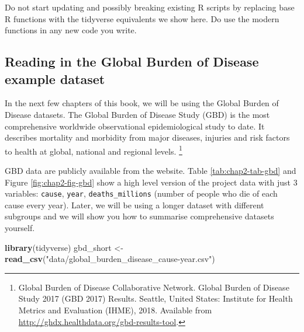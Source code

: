 \documentclass[
  12pt,
  krantz2]{krantz}
\makeatletter
\newenvironment{Shaded}{\begin{snugshade}}{\end{snugshade}}
\newcommand{\KeywordTok}[1]{\textcolor[rgb]{0.13,0.29,0.53}{\textbf{#1}}}
\newcommand{\NormalTok}[1]{#1}
\newcommand{\StringTok}[1]{\textcolor[rgb]{0.31,0.60,0.02}{#1}}
\renewenvironment{quote}{\begin{VF}}{\end{VF}}
\newenvironment{kframe}{%
\medskip{}
\setlength{\fboxsep}{.8em}
 \def\at@end@of@kframe{}%
 \ifinner\ifhmode%
  \def\at@end@of@kframe{\end{minipage}}%
  \begin{minipage}{\columnwidth}%
 \fi\fi%
 \def\FrameCommand##1{\hskip\@totalleftmargin \hskip-\fboxsep
 \colorbox{shadecolor}{##1}\hskip-\fboxsep
     \hskip-\linewidth \hskip-\@totalleftmargin \hskip\columnwidth}%
 \MakeFramed {\advance\hsize-\width
   \@totalleftmargin\z@ \linewidth\hsize
   \@setminipage}}%
 {\par\unskip\endMakeFramed%
 \at@end@of@kframe}
\renewenvironment{Shaded}{\begin{kframe}}{\end{kframe}}
\makeatother
\begin{document}
\begin{quote}
Do not start updating and possibly breaking existing R scripts by replacing base R functions with the tidyverse equivalents we show here. Do use the modern functions in any new code you write.
\end{quote}

\hypertarget{reading-in-the-global-burden-of-disease-example-dataset}{%
\subsection{Reading in the Global Burden of Disease example dataset}\label{reading-in-the-global-burden-of-disease-example-dataset}}

In the next few chapters of this book, we will be using the Global Burden of Disease datasets.
The Global Burden of Disease Study (GBD) is the most comprehensive worldwide observational epidemiological study to date.
It describes mortality and morbidity from major diseases, injuries and risk factors to health at global, national and regional levels.
\footnote{Global Burden of Disease Collaborative Network.
  Global Burden of Disease Study 2017 (GBD 2017) Results.
  Seattle, United States: Institute for Health Metrics and Evaluation (IHME), 2018.
  Available from \url{http://ghdx.healthdata.org/gbd-results-tool}.}

GBD data are publicly available from the website.
Table \ref{tab:chap2-tab-gbd} and Figure \ref{fig:chap2-fig-gbd} show a high level version of the project data with just 3 variables: \texttt{cause}, \texttt{year}, \texttt{deaths\_millions} (number of people who die of each cause every year).
Later, we will be using a longer dataset with different subgroups and we will show you how to summarise comprehensive datasets yourself.

\begin{Shaded}
\begin{Highlighting}[]
\KeywordTok{library}\NormalTok{(tidyverse)}
\NormalTok{gbd_short <-}\StringTok{ }\KeywordTok{read_csv}\NormalTok{(}\StringTok{"data/global_burden_disease_cause-year.csv"}\NormalTok{)}
\end{Highlighting}
\end{Shaded}
\end{document}
